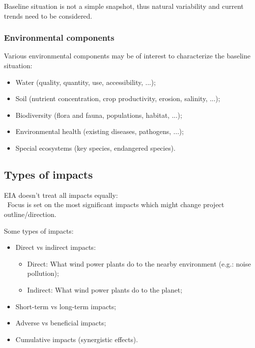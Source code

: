 \documentclass{article}
\newcommand{\tra}{\textrightarrow\ }
\begin{document}
Baseline situation is not a simple snapshot, thus natural variability
and current trends need to be considered.

\subsubsection{Environmental components}
Various environmental components may be of interest to characterize the baseline situation:
\begin{itemize}
    \item Water (quality, quantity, use, accessibility, ...);
    \item Soil (nutrient concentration, crop productivity, erosion, salinity, ...);
    \item Biodiversity (flora and fauna, populations, habitat, ...);
    \item Environmental health (existing diseases, pathogens, ...);
    \item Special ecosystems (key species, endangered species).
\end{itemize}

\subsection{Types of impacts}
EIA doesn't treat all impacts equally:\\
\tra Focus is set on the most significant impacts which might
change project outline/direction.

Some types of impacts:
\begin{itemize}
    \item Direct vs indirect impacts:
        \begin{itemize}
            \item Direct: What wind power plants do to the nearby environment (e.g.: noise pollution);
            \item Indirect: What wind power plants do to the planet;
        \end{itemize}
    \item Short-term vs long-term impacts;
    \item Adverse vs beneficial impacts;
    \item Cumulative impacts (synergistic effects).
\end{itemize}
\end{document}
